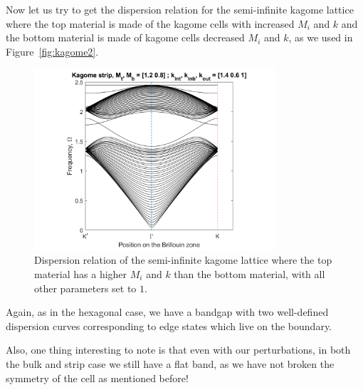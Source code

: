 Now let us try to get the dispersion relation for the semi-infinite kagome
lattice where the top material is made of the kagome cells with increased $M_i$
and $k$ and the bottom material is made of kagome cells decreased $M_i$ and
$k$, as we used in Figure~\ref{fig:kagome2}.

\begin{figure}[!h]
\centering
\includegraphics[width=0.8\textwidth]{imgs/kagomestripperturbed.png}
\caption{\label{fig:kagomeperturbed} Dispersion relation of the semi-infinite
  kagome lattice where the top material has a higher $M_i$ and $k$ than the
  bottom material, with all other parameters set to $1$.}
\end{figure}

Again, as in the hexagonal case, we have a bandgap with two well-defined
dispersion curves corresponding to edge states which live on the boundary.

Also, one thing interesting to note is that even with our perturbations, in
both the bulk and strip case we still have a flat band, as we have not broken
the symmetry of the cell as mentioned before!\cite{flatlines}
